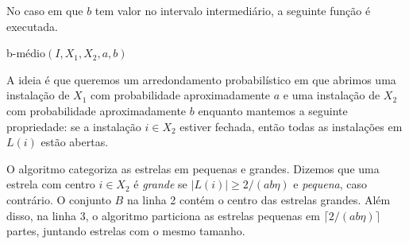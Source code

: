 No caso em que $b$ tem valor no intervalo intermediário, a seguinte função é executada.
\begin{algorithm}[H]
    \caption{\sc b-médio$(I,X_1,X_2,a,b)$}
\end{algorithm}

A ideia é que queremos um arredondamento probabilístico em que abrimos uma instalação de $X_1$ com probabilidade aproximadamente $a$ e uma instalação de $X_2$ com probabilidade aproximadamente $b$ enquanto mantemos a seguinte propriedade: se a instalação $i \in X_2$ estiver fechada, então todas as instalações em $L(i)$ estão abertas.

O algoritmo categoriza as estrelas em pequenas e grandes. Dizemos que uma estrela com centro $i \in X_2$ é \emph{grande} se $|L(i)| /(ab\eta)$ e \emph{pequena}, caso contrário. O conjunto $B$ na linha 2 contém o centro das estrelas grandes. Além disso, na linha 3, o algoritmo particiona as estrelas pequenas em $/(ab\eta)\rceil$ partes, juntando estrelas com o mesmo tamanho.

